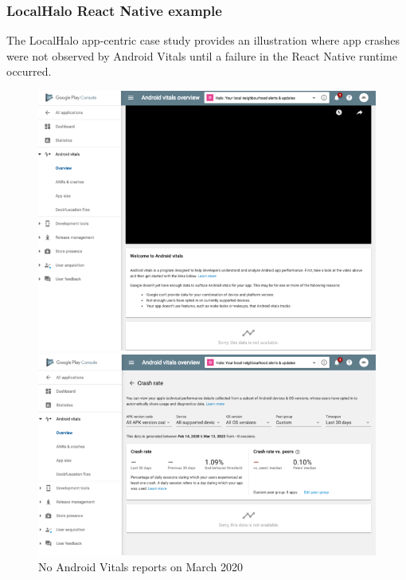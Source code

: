 \subsubsection{LocalHalo React Native example}
The LocalHalo app-centric case study provides an illustration where app crashes were not observed by Android Vitals until a failure in the React Native runtime occurred.

\begin{figure}[htbp!]
\centering
\begin{minipage}{.45\textwidth}
  \centering
  \includegraphics[width=\textwidth]{images/localhalo/apphealthoverviewplace_5550596_no_data.png}
\end{minipage}\hfill%
\begin{minipage}{.45\textwidth}
  \centering
  \includegraphics[width=\textwidth]{images/localhalo/apphealthdetailsplace_55505963_no_data.png}
\end{minipage}
    \caption{No Android Vitals reports on  March 2020}
    \label{fig:localhalo-android-vitals-no-data-16-march-2020}
\end{figure}

